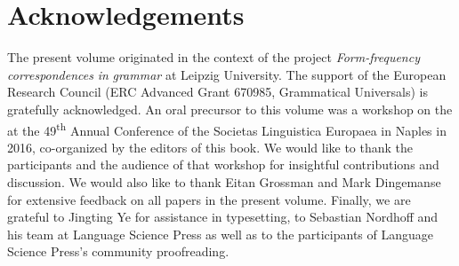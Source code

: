 \documentclass[output=paper]{langsci/langscibook}
\begin{document}
\section*{Acknowledgements}

The present volume originated in the context of the project \textit{Form-frequency} \textit{correspondences} \textit{in} \textit{grammar} at Leipzig University. The support of the European Research Council (ERC Advanced Grant 670985, Grammatical Universals) is gratefully acknowledged. An oral precursor to this volume was a workshop on the  at the 49\textsuperscript{th} Annual Conference of the Societas Linguistica Europaea in Naples in 2016, co-organized by the editors of this book. We would like to thank the participants and the audience of that workshop for insightful contributions and discussion. We would also like to thank Eitan Grossman and Mark Dingemanse for extensive feedback on all papers in the present volume. Finally, we are grateful to Jingting Ye for assistance in typesetting, to Sebastian Nordhoff and his team at Language Science Press as well as to the participants of Language Science Press’s community proofreading.

\sloppy
\printbibliography[heading=subbibliography,notkeyword=this]
 
\end{document}
